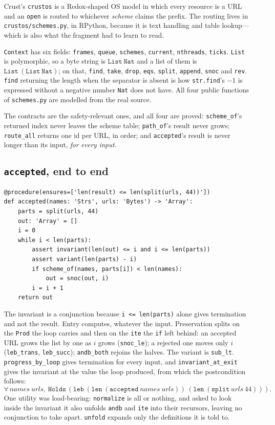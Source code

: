 \documentclass[11pt]{article}
\newcommand{\code}[1]{\texttt{#1}}
\begin{document}
Crust's \code{crustos} is a Redox-shaped OS model in which every resource is a
URL and an \code{open} is routed to whichever \emph{scheme} claims the prefix.
The routing lives in \code{crustos/schemes.py}, in RPython, because it is text
handling and table lookup---which is also what the fragment had to learn to
read.

\code{Context} has six fields: \code{frames}, \code{queue}, \code{schemes},
\code{current}, \code{nthreads}, \code{ticks}. \code{List} is polymorphic, so a
byte string is $\code{List}\ \code{Nat}$ and a list of them is
$\code{List}\ (\code{List}\ \code{Nat})$; on that, \code{find}, \code{take},
\code{drop}, \code{eqs}, \code{split}, \code{append}, \code{snoc} and
\code{rev}. \code{find} returning the length when the separator is absent is
how \code{str.find}'s $-1$ is expressed without a negative number \code{Nat}
does not have. All four public functions of \code{schemes.py} are modelled from
the real source.

The contracts are the safety-relevant ones, and all four are proved:
\code{scheme\_of}'s returned index never leaves the scheme table;
\code{path\_of}'s result never grows; \code{route\_all} returns one id per
URL, in order; and \code{accepted}'s result is never longer than its input,
\emph{for every input}.

\subsection{\code{accepted}, end to end}
\label{sec:accepted}

\begin{lstlisting}[basicstyle=\tiny\ttfamily]
@procedure(ensures=['len(result) <= len(split(urls, 44))'])
def accepted(names: 'Strs', urls: 'Bytes') -> 'Array':
    parts = split(urls, 44)
    out: 'Array' = []
    i = 0
    while i < len(parts):
        assert invariant(len(out) <= i and i <= len(parts))
        assert variant(len(parts) - i)
        if scheme_of(names, parts[i]) < len(names):
            out = snoc(out, i)
        i = i + 1
    return out
\end{lstlisting}

The invariant is a conjunction because \code{i <= len(parts)} alone gives
termination and not the result. Entry computes, whatever the input.
Preservation splits on the \code{Prod} the loop carries and then on the
\code{ite} the \code{if} left behind: an accepted URL grows the list by one as
$i$ grows (\code{snoc\_le}); a rejected one moves only $i$
(\code{leb\_trans}, \code{leb\_succ}); \code{andb\_both} rejoins the halves.
The variant is \code{sub\_lt}. \code{progress\_by\_loop} gives termination
for every input, and \code{invariant\_at\_exit} gives the invariant at the
value the loop produced, from which the postcondition follows:
\[
  \forall\,\mathit{names}\ \mathit{urls},\
  \code{Holds}\,(\code{leb}\ (\code{len}\ (\code{accepted}\ \mathit{names}\ \mathit{urls}))\
  (\code{len}\ (\code{split}\ \mathit{urls}\ 44))).
\]
One utility was load-bearing: \code{normalize} is all or nothing, and asked
to look inside the invariant it also unfolds \code{andb} and \code{ite} into
their recursors, leaving no conjunction to take apart. \code{unfold} expands
only the definitions it is told to.
\end{document}
